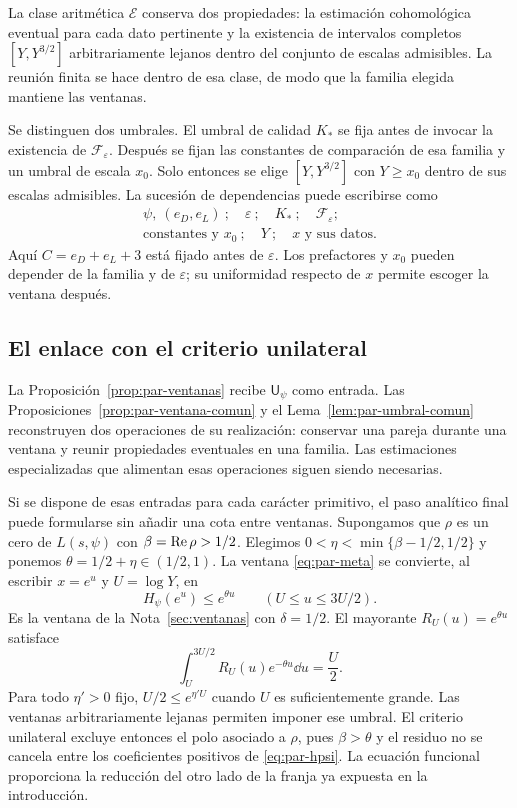 La clase aritmética $\mathcal E$ conserva dos propiedades: la
estimación cohomológica eventual para cada dato pertinente y la
existencia de intervalos completos $[Y,Y^{3/2}]$ arbitrariamente
lejanos dentro del conjunto de escalas admisibles. La reunión finita
se hace dentro de esa clase, de modo que la familia elegida mantiene
las ventanas.

Se distinguen dos umbrales. El umbral de calidad $K_*$ se fija antes
de invocar la existencia de $\mathcal F_\varepsilon$.
Después se fijan las constantes de comparación de esa familia y
un umbral de escala $x_0$. Solo entonces se elige
$[Y,Y^{3/2}]$ con $Y\ge x_0$ dentro de sus escalas admisibles.
La sucesión de dependencias puede escribirse como
\begin{equation}
 \begin{gathered}
 \psi,\ (e_D,e_L)
 \ ;\quad \varepsilon
 \ ;\quad K_*
 \ ;\quad \mathcal F_\varepsilon;\\
 \text{constantes y }x_0
 \ ;\quad Y
 \ ;\quad x\text{ y sus datos}.
 \end{gathered}
 \label{eq:par-orden-familia}
\end{equation}
Aquí $C=e_D+e_L+3$ está fijado antes de $\varepsilon$.
Los prefactores y $x_0$ pueden depender de la familia y de
$\varepsilon$; su uniformidad respecto de $x$ permite escoger
la ventana después.

\subsection{El enlace con el criterio unilateral}

La Proposición~\ref{prop:par-ventanas} recibe
$\mathsf U_\psi$ como entrada. Las
Proposiciones~\ref{prop:par-ventana-comun} y el
Lema~\ref{lem:par-umbral-comun} reconstruyen dos operaciones
de su realización: conservar una pareja durante una ventana y
reunir propiedades eventuales en una familia. Las estimaciones
especializadas que alimentan esas operaciones siguen siendo
necesarias.

Si se dispone de esas entradas para cada carácter primitivo, el
paso analítico final puede formularse sin añadir una cota entre
ventanas. Supongamos que $\rho$ es un cero de $L(s,\psi)$ con
$\beta=\operatorname{Re}\rho>1/2$. Elegimos
$0<\eta<\min\{\beta-1/2,1/2\}$ y ponemos
$\theta=1/2+\eta\in(1/2,1)$. La ventana
\eqref{eq:par-meta} se convierte, al escribir $x=e^u$ y
$U=\log Y$, en
\begin{equation}
 H_\psi(e^u)\le e^{\theta u}
 \qquad(U\le u\le3U/2).
 \label{eq:par-log-ventana}
\end{equation}
Es la ventana de la Nota~\ref{sec:ventanas} con $\delta=1/2$.
El mayorante $R_U(u)=e^{\theta u}$ satisface
\[
 \int_U^{3U/2}R_U(u)e^{-\theta u}\dd u
       =\frac U2.
\]
Para todo $\eta'>0$ fijo, $U/2\le e^{\eta'U}$ cuando $U$
es suficientemente grande. Las ventanas arbitrariamente lejanas
permiten imponer ese umbral. El criterio unilateral excluye
entonces el polo asociado a $\rho$, pues $\beta>\theta$ y
el residuo no se cancela entre los coeficientes positivos de
\eqref{eq:par-hpsi}. La ecuación funcional proporciona la reducción
del otro lado de la franja ya expuesta en la introducción.


